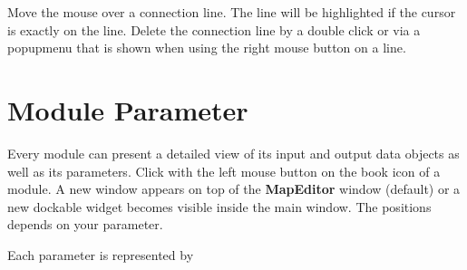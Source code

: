     Move the mouse over a connection line. The line will be highlighted if the cursor is exactly on the 
    line. Delete the connection line by a double click or via a popupmenu that is shown 
    when using the right mouse button on a line.
    



    
	 \section{Module Parameter}
	 \label{parameter}

	 Every module can present a detailed view of its input and output data objects 
	 as well as its parameters. Click with the left mouse button on the book icon of a module. 
    A new window appears on top of the {\bf MapEditor} window (default) or a new dockable widget becomes 
    visible inside the main {\mapeditor} window. The positions depends on your {\mysetting} parameter.


	 Each parameter is represented  by 

